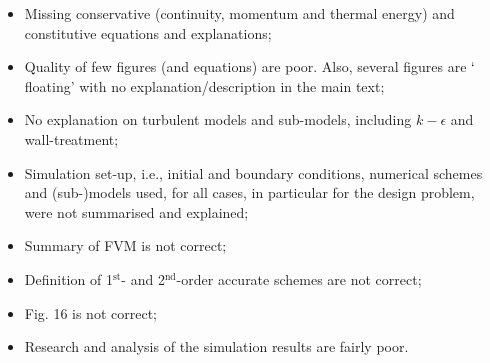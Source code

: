 \documentclass[14pt,twoside]{report}
\begin{document}


\clearpage




\bigskip


\medskip

  \begin{itemize}
%
     \item Missing conservative (continuity, momentum and thermal energy) and constitutive equations and explanations;
     \item Quality of few figures (and equations) are poor. Also, several figures are $\lq$floating' with no explanation/description in the main text;
     \item No explanation on turbulent models and sub-models, including $k-\epsilon$ and wall-treatment;
     \item Simulation set-up, i.e., initial and boundary conditions, numerical schemes and (sub-)models used, for all cases, in particular for the design problem, were not summarised and explained;
     \item Summary of FVM is not correct;
     \item Definition of 1$^{\text{st}}$- and 2$^{\text{nd}}$-order accurate schemes are not correct;
     \item Fig. 16 is not correct;
     \item Research and analysis of the simulation results are fairly poor.
%
  \end{itemize}

\clearpage
\end{document}
